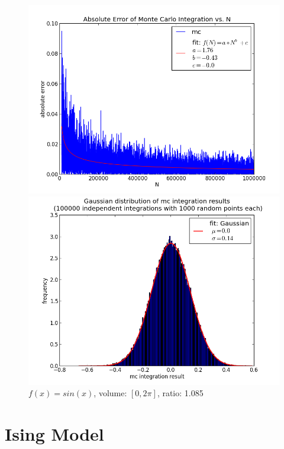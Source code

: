 \documentclass[12pt,a4paper,titlepage]{article}
\begin{document}
\begin{figure}
	\centering
	\caption{$f(x)=sin(x)$, volume: $[0,2\pi]$, ratio: 1.085}
	\begin{minipage}[b]{\linewidth}
		\centering
		\includegraphics[width=\linewidth]{Plots/sin}
	\end{minipage}
	\begin{minipage}[b]{\linewidth}
		\centering
		\includegraphics[width=\linewidth]{Plots/sin_hist}
	\end{minipage}
	\label{fig:linear}
\end{figure}

\newpage
\section{Ising Model}
\end{document}
